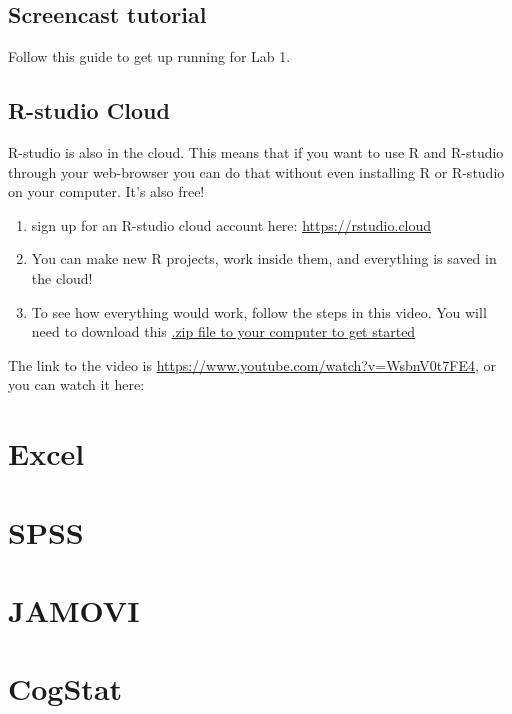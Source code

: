 \documentclass[
]{book}
\begin{document}
\hypertarget{screencast-tutorial}{%
\subsection{Screencast tutorial}\label{screencast-tutorial}}

Follow this guide to get up running for Lab 1.

\hypertarget{r-studio-cloud}{%
\subsection{R-studio Cloud}\label{r-studio-cloud}}

R-studio is also in the cloud. This means that if you want to use R and R-studio through your web-browser you can do that without even installing R or R-studio on your computer. It's also free!

\begin{enumerate}
\def\labelenumi{\arabic{enumi}.}
\item
  sign up for an R-studio cloud account here: \url{https://rstudio.cloud}
\item
  You can make new R projects, work inside them, and everything is saved in the cloud!
\item
  To see how everything would work, follow the steps in this video. You will need to download this \href{https://github.com/CrumpLab/statisticsLab/raw/master/RstudioCloud.zip}{.zip file to your computer to get started}
\end{enumerate}

The link to the video is \url{https://www.youtube.com/watch?v=WsbnV0t7FE4}, or you can watch it here:

\hypertarget{excel}{%
\section{Excel}\label{excel}}

\hypertarget{spss}{%
\section{SPSS}\label{spss}}

\hypertarget{jamovi}{%
\section{JAMOVI}\label{jamovi}}

\hypertarget{cogstat}{%
\section{CogStat}\label{cogstat}}
\end{document}
